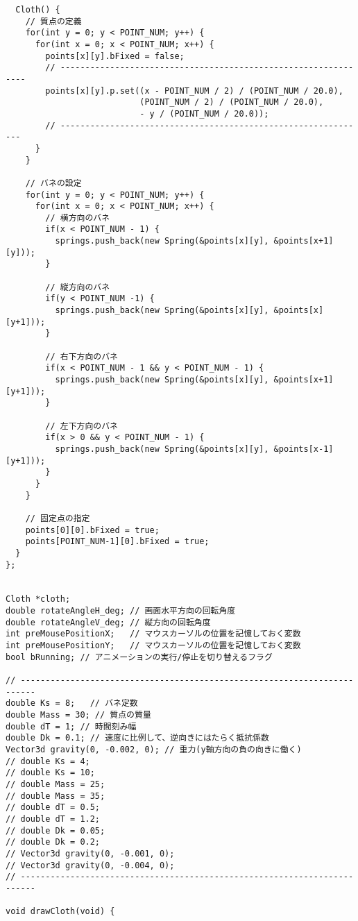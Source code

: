 \documentclass{scrartcl}
\begin{document}
\begin{verbatim}
  Cloth() {
    // 質点の定義
    for(int y = 0; y < POINT_NUM; y++) {
      for(int x = 0; x < POINT_NUM; x++) {
        points[x][y].bFixed = false;
        // ---------------------------------------------------------------
        points[x][y].p.set((x - POINT_NUM / 2) / (POINT_NUM / 20.0),
                           (POINT_NUM / 2) / (POINT_NUM / 20.0),
                           - y / (POINT_NUM / 20.0));
        // --------------------------------------------------------------
      }
    }

    // バネの設定
    for(int y = 0; y < POINT_NUM; y++) {
      for(int x = 0; x < POINT_NUM; x++) {
        // 横方向のバネ
        if(x < POINT_NUM - 1) {				
          springs.push_back(new Spring(&points[x][y], &points[x+1][y]));
        }

        // 縦方向のバネ
        if(y < POINT_NUM -1) {
          springs.push_back(new Spring(&points[x][y], &points[x][y+1]));
        }

        // 右下方向のバネ
        if(x < POINT_NUM - 1 && y < POINT_NUM - 1) {				
          springs.push_back(new Spring(&points[x][y], &points[x+1][y+1]));
        }

        // 左下方向のバネ
        if(x > 0 && y < POINT_NUM - 1) {				
          springs.push_back(new Spring(&points[x][y], &points[x-1][y+1]));
        }
      }
    }

    // 固定点の指定
    points[0][0].bFixed = true;
    points[POINT_NUM-1][0].bFixed = true;
  }
};


Cloth *cloth;
double rotateAngleH_deg; // 画面水平方向の回転角度
double rotateAngleV_deg; // 縦方向の回転角度
int preMousePositionX;   // マウスカーソルの位置を記憶しておく変数
int preMousePositionY;   // マウスカーソルの位置を記憶しておく変数
bool bRunning; // アニメーションの実行/停止を切り替えるフラグ

// -------------------------------------------------------------------------
double Ks = 8;   // バネ定数
double Mass = 30; // 質点の質量
double dT = 1; // 時間刻み幅
double Dk = 0.1; // 速度に比例して、逆向きにはたらく抵抗係数
Vector3d gravity(0, -0.002, 0); // 重力(y軸方向の負の向きに働く)
// double Ks = 4;
// double Ks = 10;
// double Mass = 25;
// double Mass = 35;
// double dT = 0.5;
// double dT = 1.2;
// double Dk = 0.05;
// double Dk = 0.2;
// Vector3d gravity(0, -0.001, 0);
// Vector3d gravity(0, -0.004, 0);
// -------------------------------------------------------------------------

void drawCloth(void) {


\end{verbatim}
\end{document}
